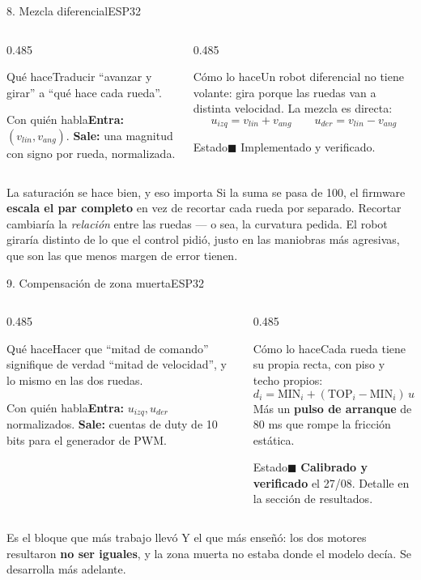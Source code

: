 \documentclass[aspectratio=169,10pt]{beamer}
\newcommand{\listo}{\textcolor{verde}{$\blacksquare$}}
\newcommand{\ficha}[4]{%
  {\footnotesize
  \begin{columns}[T,onlytextwidth]
    \begin{column}{0.485\textwidth}
      \begin{block}{Qué hace}#1\end{block}
      \begin{block}{Con quién habla}#3\end{block}
    \end{column}
    \begin{column}{0.485\textwidth}
      \begin{block}{Cómo lo hace}#2\end{block}
      \begin{block}{Estado}#4\end{block}
    \end{column}
  \end{columns}}}
\begin{document}
\begin{frame}{8. Mezcla diferencial\hfill{\small\mdseries ESP32}}
  \ficha
  {Traducir ``avanzar y girar'' a ``qué hace cada rueda''.}
  {Un robot diferencial no tiene volante: gira porque las ruedas van a distinta
   velocidad. La mezcla es directa:
   \[ u_{izq} = v_{lin} + v_{ang} \qquad u_{der} = v_{lin} - v_{ang} \]}
  {\textbf{Entra:} $(v_{lin}, v_{ang})$. \textbf{Sale:} una magnitud con signo
   por rueda, normalizada.}
  {\listo{} Implementado y verificado.}

  \vspace{0.4em}
  \small
  \begin{alertblock}{La saturación se hace bien, y eso importa}
    Si la suma se pasa de 100, el firmware \textbf{escala el par completo} en vez
    de recortar cada rueda por separado. Recortar cambiaría la \emph{relación}
    entre las ruedas --- o sea, la curvatura pedida. El robot giraría distinto de
    lo que el control pidió, justo en las maniobras más agresivas, que son las
    que menos margen de error tienen.
  \end{alertblock}
\end{frame}

\begin{frame}{9. Compensación de zona muerta\hfill{\small\mdseries ESP32}}
  \ficha
  {Hacer que ``mitad de comando'' signifique de verdad ``mitad de velocidad'',
   y lo mismo en las dos ruedas.}
  {Cada rueda tiene su propia recta, con piso y techo propios:
   \[ d_i = \mathrm{MIN}_i + (\mathrm{TOP}_i - \mathrm{MIN}_i)\, u \]
   Más un \textbf{pulso de arranque} de 80 ms que rompe la fricción estática.}
  {\textbf{Entra:} $u_{izq}, u_{der}$ normalizados. \textbf{Sale:} cuentas de
   duty de 10 bits para el generador de PWM.}
  {\listo{} \textbf{Calibrado y verificado} el 27/08. Detalle en la sección de
   resultados.}

  \vspace{0.3em}
  \small
  \begin{block}{Es el bloque que más trabajo llevó}
    Y el que más enseñó: los dos motores resultaron \textbf{no ser iguales}, y la
    zona muerta no estaba donde el modelo decía. Se desarrolla más adelante.
  \end{block}
\end{frame}
\end{document}
